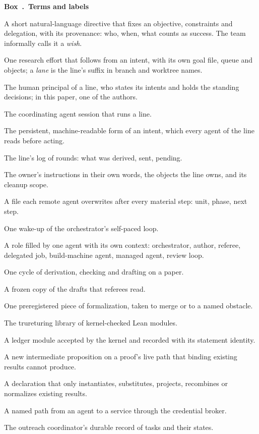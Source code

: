 \documentclass[11pt]{article}
\newcounter{protocolbox}
\newenvironment{protocol}[1]{\refstepcounter{protocolbox}\begin{framed}\noindent\textbf{Box~\theprotocolbox.\ #1}\par\small}{\end{framed}}
\begin{document}
\begin{protocol}{Terms and labels}
\label{box:terms}
\begin{description}[leftmargin=0pt,itemsep=1pt,font=\normalfont\bfseries]
\item[Intent] A short natural-language directive that fixes an objective,
constraints and delegation, with its provenance: who, when, what counts as
success. The team informally calls it a \emph{wish}.
\item[Line] One research effort that follows from an intent, with its own goal
file, queue and objects; a \emph{lane} is the line's suffix in branch and
worktree names.
\item[Owner] The human principal of a line, who states its intents and holds
the standing decisions; in this paper, one of the authors.
\item[Orchestrator] The coordinating agent session that runs a line.
\item[Goal file] The persistent, machine-readable form of an intent, which
every agent of the line reads before acting.
\item[Queue] The line's log of rounds: what was derived, sent, pending.
\item[Memory note] The owner's instructions in their own words, the objects
the line owns, and its cleanup scope.
\item[Status file] A file each remote agent overwrites after every material
step: unit, phase, next step.
\item[Tick] One wake-up of the orchestrator's self-paced loop.
\item[Seat] A role filled by one agent with its own context: orchestrator,
author, referee, delegated job, build-machine agent, managed agent, review
loop.
\item[Round] One cycle of derivation, checking and drafting on a paper.
\item[Numbered snapshot] A frozen copy of the drafts that referees read.
\item[Unit] One preregistered piece of formalization, taken to merge or to
a named obstacle.
\item[Ledger] The trureturing library of kernel-checked Lean modules.
\item[Frozen] A ledger module accepted by the kernel and recorded with its
statement identity.
\item[Escape witness] A new intermediate proposition on a proof's live path
that binding existing results cannot produce.
\item[Bind-only] A declaration that only instantiates, substitutes,
projects, recombines or normalizes existing results.
\item[Route] A named path from an agent to a service through the
credential broker.
\item[Task log] The outreach coordinator's durable record of tasks and their
states.
\end{description}
\end{protocol}
\end{document}
